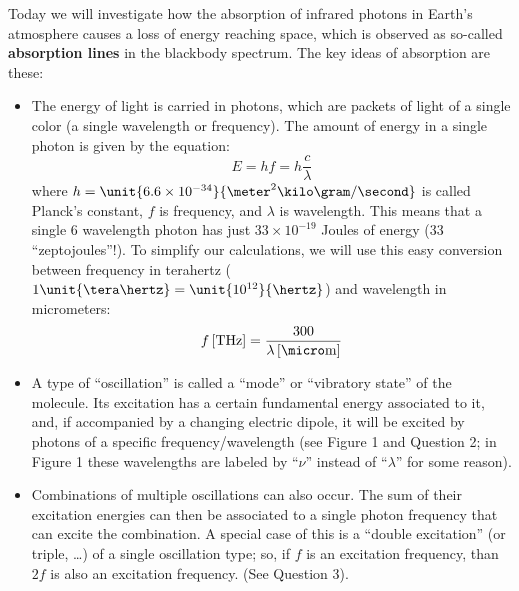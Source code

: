 \documentclass[12pt]{article}
\begin{document}
\noindent Today we will investigate how the absorption of infrared photons in Earth's atmosphere causes a loss of energy reaching space, which is observed as so-called {\bf absorption lines} in the blackbody spectrum.  The key ideas of absorption are these:
	\begin{itemize}
	\item The energy of light is carried in photons, which are packets of light of a single color (a single wavelength or frequency).  The amount of energy in a single photon is given by the equation:
		\begin{equation*}
		E = h f = h \frac{c}{\lambda}
		\end{equation*}
	where $h = \unit{6.6\times10^{-34}}{\meter^2 \kilo\gram / \second}$ is called Planck's constant, $f$ is frequency, and $\lambda$ is wavelength.  This means that a single \unit{6}{\micro\meter} wavelength photon has just  $33 \times 10^{-19}$ Joules of energy (33 ``zeptojoules''!).  To simplify our calculations, we will use this easy conversion between frequency in terahertz ($1\unit{\tera\hertz} = \unit{10^{12}}{\hertz}$) and wavelength in micrometers:
		\begin{equation*}
		f \,[\text{THz}] = \frac{300}{\lambda \, [\micro \text{m}]}
		\end{equation*}
	\item A type of ``oscillation'' is called a ``mode'' or ``vibratory state'' of the molecule.  Its excitation has a certain fundamental energy associated to it, and, if accompanied by a changing electric dipole, it will be excited by photons of a specific frequency/wavelength (see Figure 1 and Question 2; in Figure 1 these wavelengths are labeled by ``$\nu$'' instead of ``$\lambda$'' for some reason).
	\item Combinations of multiple oscillations can also occur. The sum of their excitation energies can then be associated to a single photon frequency that can excite the combination.  A special case of this is a ``double excitation'' (or triple, \ldots) of a single oscillation type; so, if $f$ is an excitation frequency, than $2f$ is also an excitation frequency. (See Question 3).
	\end{itemize}

\newpage
\end{document}
